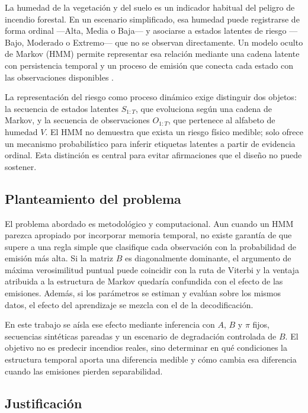 \documentclass[11pt,letterpaper]{article}
\begin{document}
La humedad de la vegetación y del suelo es un indicador habitual del peligro de incendio forestal. En un escenario simplificado, esa humedad puede registrarse de forma ordinal ---Alta, Media o Baja--- y asociarse a estados latentes de riesgo ---Bajo, Moderado o Extremo--- que no se observan directamente. Un modelo oculto de Markov (HMM) permite representar esa relación mediante una cadena latente con persistencia temporal y un proceso de emisión que conecta cada estado con las observaciones disponibles \cite{rabiner1989}.

La representación del riesgo como proceso dinámico exige distinguir dos objetos: la secuencia de estados latentes \(S_{1:T}\), que evoluciona según una cadena de Markov, y la secuencia de observaciones \(O_{1:T}\), que pertenece al alfabeto de humedad \(V\). El HMM no demuestra que exista un riesgo físico medible; solo ofrece un mecanismo probabilístico para inferir etiquetas latentes a partir de evidencia ordinal. Esta distinción es central para evitar afirmaciones que el diseño no puede sostener.

\subsection{Planteamiento del problema}

El problema abordado es metodológico y computacional. Aun cuando un HMM parezca apropiado por incorporar memoria temporal, no existe garantía de que supere a una regla simple que clasifique cada observación con la probabilidad de emisión más alta. Si la matriz \(B\) es diagonalmente dominante, el argumento de máxima verosimilitud puntual puede coincidir con la ruta de Viterbi y la ventaja atribuida a la estructura de Markov quedaría confundida con el efecto de las emisiones. Además, si los parámetros se estiman y evalúan sobre los mismos datos, el efecto del aprendizaje se mezcla con el de la decodificación.

En este trabajo se aísla ese efecto mediante inferencia con \(A\), \(B\) y \(\pi\) fijos, secuencias sintéticas pareadas y un escenario de degradación controlada de \(B\). El objetivo no es predecir incendios reales, sino determinar en qué condiciones la estructura temporal aporta una diferencia medible y cómo cambia esa diferencia cuando las emisiones pierden separabilidad.

\subsection{Justificación}
\end{document}
